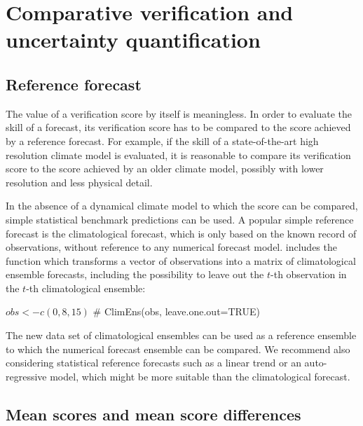 \documentclass[article]{jss}
\begin{document}
\section{Comparative verification and uncertainty quantification}


\subsection{Reference forecast}

The value of a verification score by itself is meaningless.
In order to evaluate the skill of a forecast, its verification score has to be compared to the score achieved by a reference forecast.
For example, if the skill of a state-of-the-art high resolution climate model is evaluated, it is reasonable to compare its verification score to the score achieved by an older climate model, possibly with lower resolution and less physical detail.

In the absence of a dynamical climate model to which the score can be compared, simple statistical benchmark predictions can be used.
A popular simple reference forecast is the climatological forecast, which is only based on the known record of observations, without reference to any numerical forecast model.
 includes the function  which transforms a vector of observations into a matrix of climatological ensemble forecasts, including the possibility to leave out the $t$-th observation in the $t$-th climatological ensemble:

\begin{Schunk}
\begin{Sinput}
$ obs <- c(0, 8, 15)
$ # ClimEns(obs, leave.one.out=TRUE)
\end{Sinput}
\end{Schunk}

The new data set of climatological ensembles can be used as a reference ensemble to which the numerical forecast ensemble can be compared.
We recommend also considering statistical reference forecasts such as a linear trend or an auto-regressive model, which might be more suitable than the climatological forecast.



\subsection{Mean scores and mean score differences}
\end{document}
